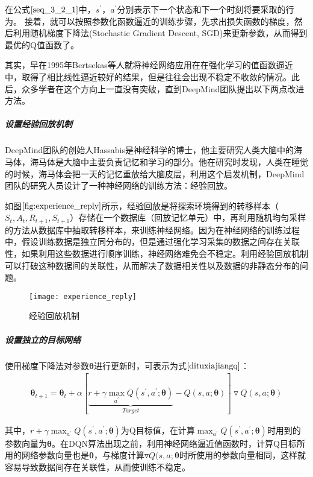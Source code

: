 在公式$\eqref{seq_3_2_1}$中，$s^{'}$，$a^{'}$分别表示下一个状态和下一个时刻将要采取的行为。
接着，就可以按照参数化函数逼近的训练步骤，先求出损失函数的梯度，然后利用随机梯度下降法(Stochastic Gradient Descent, SGD)来更新参数，从而得到最优的Q值函数了。

其实，早在1995年Bertsekas等人就将神经网络应用在在强化学习的值函数逼近中，取得了相比线性逼近较好的结果，但是往往会出现不稳定不收敛的情况\citep{bertsekas1995neuro}。此后，众多学者在这个方向上一直没有突破，直到DeepMind团队提出以下两点改进方法。

 \subparagraph{设置经验回放机制}
DeepMind团队的创始人Hassabis是神经科学的博士，他主要研究人类大脑中的海马体，海马体是大脑中主要负责记忆和学习的部分。他在研究时发现，人类在睡觉的时候，海马体会把一天的记忆重放给大脑皮层，利用这个启发机制，DeepMind团队的研究人员设计了一种神经网络的训练方法：经验回放。

如图$\ref{fig:experience_reply}$所示，经验回放是将探索环境得到的转移样本（$S_{t}, A_{t}, R_{t+1}, S_{t+1}$）存储在一个数据库（回放记忆单元）中，再利用随机均匀采样的方法从数据库中抽取转移样本，来训练神经网络。因为在神经网络的训练过程中，假设训练数据是独立同分布的，但是通过强化学习采集的数据之间存在关联性，如果利用这些数据进行顺序训练，神经网络难免会不稳定。利用经验回放机制可以打破这种数据间的关联性，从而解决了数据相关性以及数据的非静态分布的问题。
\begin{figure}[htbp]
\centering
\texttt{[image: experience\_reply]}
\caption{经验回放机制}
\label{fig:experience_reply}
\end{figure}

 \subparagraph{设置独立的目标网络}
使用梯度下降法对参数$\bm{\theta}$进行更新时，可表示为式$\eqref{dituxiajiangq}$：
\begin{equation}\label{dituxiajiangq}
\begin{aligned}
\bm{\theta}_{t+1}=\bm{\theta}_{t}+\alpha[\underbrace{r+\gamma \max_{a^{'}}Q(s^{'},a^{'};\bm{\theta})}_{Target}-Q(s,a;\bm{\theta})]\triangledown Q(s,a;\bm{\theta})
\end{aligned}
\end{equation}

其中，$r+\gamma \max_{a^{'}}Q(s^{'},a^{'};\bm{\theta})$为Q目标值，在计算$\max_{a^{'}}Q(s^{'},a^{'};\bm{\theta})$时用到的参数向量为$\bm{\theta}$。在DQN算法出现之前，利用神经网络逼近值函数时，计算Q目标所用的网络参数向量也是$\bm{\theta}$，与梯度计算$\triangledown Q(s,a;\bm{\theta}$时所使用的参数向量相同，这样就容易导致数据间存在关联性，从而使训练不稳定。

